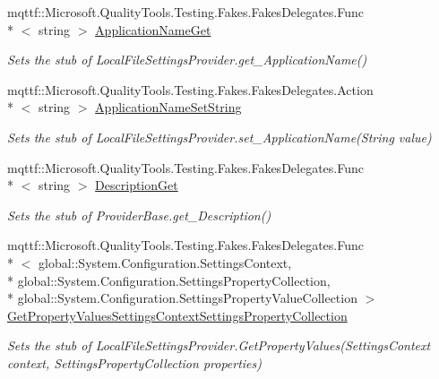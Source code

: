 \begin{DoxyCompactItemize}
\item 
mqttf\-::\-Microsoft.\-Quality\-Tools.\-Testing.\-Fakes.\-Fakes\-Delegates.\-Func\\*
$<$ string $>$ \hyperlink{class_system_1_1_configuration_1_1_fakes_1_1_stub_local_file_settings_provider_aff341dffac356a44d96f33e68c65f012}{Application\-Name\-Get}
\begin{DoxyCompactList}\small\item\em Sets the stub of Local\-File\-Settings\-Provider.\-get\-\_\-\-Application\-Name()\end{DoxyCompactList}\item 
mqttf\-::\-Microsoft.\-Quality\-Tools.\-Testing.\-Fakes.\-Fakes\-Delegates.\-Action\\*
$<$ string $>$ \hyperlink{class_system_1_1_configuration_1_1_fakes_1_1_stub_local_file_settings_provider_a9fa455de5bc499b9344ad8c24a168488}{Application\-Name\-Set\-String}
\begin{DoxyCompactList}\small\item\em Sets the stub of Local\-File\-Settings\-Provider.\-set\-\_\-\-Application\-Name(\-String value)\end{DoxyCompactList}\item 
mqttf\-::\-Microsoft.\-Quality\-Tools.\-Testing.\-Fakes.\-Fakes\-Delegates.\-Func\\*
$<$ string $>$ \hyperlink{class_system_1_1_configuration_1_1_fakes_1_1_stub_local_file_settings_provider_a6b2f36612fede308e747ff0224a2774f}{Description\-Get}
\begin{DoxyCompactList}\small\item\em Sets the stub of Provider\-Base.\-get\-\_\-\-Description()\end{DoxyCompactList}\item 
mqttf\-::\-Microsoft.\-Quality\-Tools.\-Testing.\-Fakes.\-Fakes\-Delegates.\-Func\\*
$<$ global\-::\-System.\-Configuration.\-Settings\-Context, \\*
global\-::\-System.\-Configuration.\-Settings\-Property\-Collection, \\*
global\-::\-System.\-Configuration.\-Settings\-Property\-Value\-Collection $>$ \hyperlink{class_system_1_1_configuration_1_1_fakes_1_1_stub_local_file_settings_provider_a7809a11eb929f3d2ff2134dfc2c04e25}{Get\-Property\-Values\-Settings\-Context\-Settings\-Property\-Collection}
\begin{DoxyCompactList}\small\item\em Sets the stub of Local\-File\-Settings\-Provider.\-Get\-Property\-Values(\-Settings\-Context context, Settings\-Property\-Collection properties)\end{DoxyCompactList}\item 

\end{DoxyCompactItemize}
